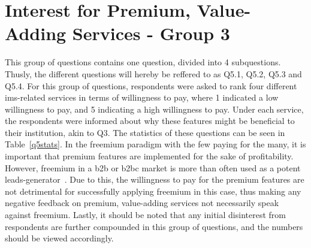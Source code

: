 \section{Interest for Premium, Value-Adding Services - Group 3}
This group of questions contains one question, divided into 4 subquestions. Thusly, the different questions will hereby be reffered to as Q5.1, Q5.2, Q5.3 and Q5.4. For this group of questions, respondents were asked to rank four different \gls{ims}-related services in terms of willingness to pay, where 1 indicated a low willingness to pay, and 5 indicating a high willingness to pay. Under each service, the respondents were informed about why these features might be beneficial to their institution, akin to Q3. The statistics of these questions can be seen in Table~\ref{q5stats}. In the freemium paradigm with the few paying for the many, it is important that premium features are implemented for the sake of profitability. However, freemium in a \gls{b2b} or \gls{b2bc} market is more than often used as a potent leads-generator~\cite{jepson2009freemium}. Due to this, the willingness to pay for the premium features are not detrimental for successfully applying freemium in this case, thus making any negative feedback on premium, value-adding services not necessarily speak against freemium. Lastly, it should be noted that any initial disinterest from respondents are further compounded in this group of questions, and the numbers should be viewed accordingly.

\begin{table}[]
\centering
\caption{Statistics: Question Group 3}
\label{q5stats}
\end{table}


